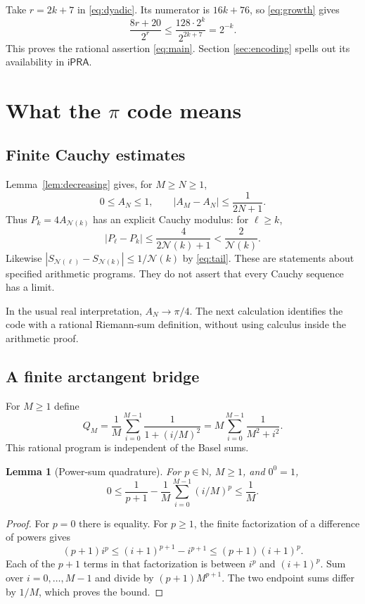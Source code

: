 \documentclass[11pt,a4paper]{article}
\newtheorem{lemma}[theorem]{Lemma}
\theoremstyle{remark}\newtheorem{remark}[theorem]{Remark}
\newcommand{\N}{\mathbb N}
\newcommand{\ipra}{\mathsf{iPRA}}
\newcommand{\abs}[1]{\left|#1\right|}
\newcommand{\cut}{\mathcal N}
\begin{document}
Take $r=2k+7$ in \eqref{eq:dyadic}. Its numerator is $16k+76$,
so \eqref{eq:growth} gives
\[
 \frac{8r+20}{2^r}
 \le\frac{128\cdot2^k}{2^{2k+7}}=2^{-k}.
\]
This proves the rational assertion \eqref{eq:main}. Section
\ref{sec:encoding} spells out its availability in $\ipra$.

\section{What the \texorpdfstring{$\pi$}{pi} code means}\label{sec:pi}

\subsection{Finite Cauchy estimates}

Lemma~\ref{lem:decreasing} gives, for $M\ge N\ge1$,
\begin{equation}\label{eq:gregorytail}
 0\le A_N\le1,\qquad
 \abs{A_M-A_N}\le\frac1{2N+1}.
\end{equation}
Thus $P_k=4A_{\cut(k)}$ has an explicit Cauchy modulus: for
$\ell\ge k$,
\[
 \abs{P_\ell-P_k}\le\frac4{2\cut(k)+1}<\frac2{\cut(k)}.
\]
Likewise
$\abs{S_{\cut(\ell)}-S_{\cut(k)}}\le1/\cut(k)$
by \eqref{eq:tail}. These are statements about specified arithmetic
programs. They do not assert that every Cauchy sequence has a limit.

In the usual real interpretation, $A_N\to\pi/4$. The next calculation
identifies the code with a rational Riemann-sum definition, without
using calculus inside the arithmetic proof.

\subsection{A finite arctangent bridge}\label{sec:riemann}

For $M\ge1$ define
\begin{equation}\label{eq:QM}
 Q_M=\frac1M\sum_{i=0}^{M-1}\frac1{1+(i/M)^2}
     =M\sum_{i=0}^{M-1}\frac1{M^2+i^2}.
\end{equation}
This rational program is independent of the Basel sums.

\begin{lemma}[Power-sum quadrature]\label{lem:moment}
For $p\in\N$, $M\ge1$, and $0^0=1$,
\[
 0\le\frac1{p+1}
       -\frac1M\sum_{i=0}^{M-1}(i/M)^p\le\frac1M.
\]
\end{lemma}
\begin{proof}
For $p=0$ there is equality. For $p\ge1$, the finite factorization
of a difference of powers gives
\[
 (p+1)i^p\le(i+1)^{p+1}-i^{p+1}\le(p+1)(i+1)^p.
\]
Each of the $p+1$ terms in that factorization is between $i^p$
and $(i+1)^p$. Sum over $i=0,\ldots,M-1$ and divide by
$(p+1)M^{p+1}$. The two endpoint sums differ by $1/M$,
which proves the bound.
\end{proof}
\end{document}
